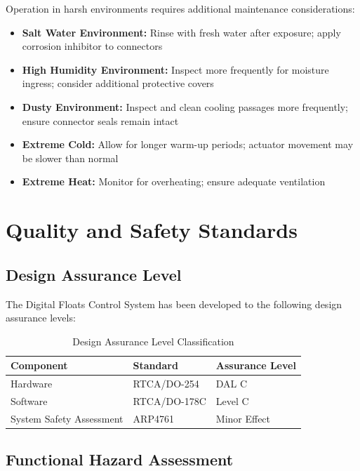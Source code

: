 \documentclass[12pt,a4paper,twoside,openright]{book}
\newcommand{\tabletextfont}{\normalfont\rmfamily}
\newcommand{\tableheadfont}{\normalfont\bfseries}
\begin{document}
Operation in harsh environments requires additional maintenance considerations:

\begin{itemize}
    \item \textbf{Salt Water Environment:} Rinse with fresh water after exposure; apply corrosion inhibitor to connectors
    \item \textbf{High Humidity Environment:} Inspect more frequently for moisture ingress; consider additional protective covers
    \item \textbf{Dusty Environment:} Inspect and clean cooling passages more frequently; ensure connector seals remain intact
    \item \textbf{Extreme Cold:} Allow for longer warm-up periods; actuator movement may be slower than normal
    \item \textbf{Extreme Heat:} Monitor for overheating; ensure adequate ventilation
\end{itemize}

\section{Quality and Safety Standards}

\subsection{Design Assurance Level}

The Digital Floats Control System has been developed to the following design assurance levels:

\begin{table}[h]
\centering
\setlength{\tabcolsep}{5pt} %
\begin{tabular}{|p{}|p{}|p{}|}
\hline
\tableheadfont\textbf{Component} & \tableheadfont\textbf{Standard} & \tableheadfont\textbf{Assurance Level} \\
\hline
\tabletextfont Hardware & RTCA/DO-254 & DAL C \\
\hline
\tabletextfont Software & RTCA/DO-178C & Level C \\
\hline
\tabletextfont System Safety Assessment & ARP4761 & Minor Effect \\
\hline
\end{tabular}
\caption{Design Assurance Level Classification}
\end{table}

\subsection{Functional Hazard Assessment}
\end{document}
